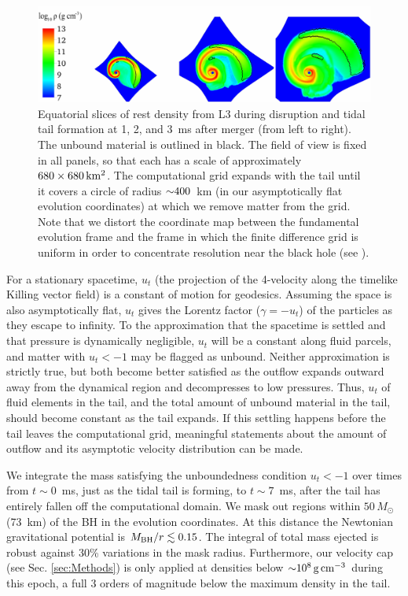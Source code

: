 \begin{figure}
\centering
\includegraphics[width=16cm]{Figures/rho_unbound_1ms_2ms_3ms}
\caption[Time sequence of dynamical ejecta]{
Equatorial slices of rest density from L3
during disruption and tidal tail formation at 1, 2, and 3~ms after merger
(from left to right).
The unbound material is outlined in black. The field of
view is fixed in all panels, so that each
has a scale of approximately $680\times680\rm\,km^2$.
The computational grid expands with the tail until it covers a circle of
radius $\mathord{\sim}400$~km (in our asymptotically flat evolution coordinates)
at which we remove matter from the grid. Note that we distort the
coordinate map between the fundamental evolution frame and the
frame in which the finite difference grid is uniform
in order to concentrate resolution near the black hole (see \citealt{duez2009-3d_eos_advection}).
}
\label{fig:disruptionsnapshots}
\end{figure}

For a stationary spacetime, $u_t$ (the projection of the 4-velocity along
the timelike Killing vector field) is a constant of motion for geodesics. 
Assuming the space is also asymptotically flat, $u_t$ gives the Lorentz
factor ($\gamma=-u_t$) of the particles as they escape to infinity.  To the
approximation that the spacetime is settled and that pressure is dynamically
negligible, $u_t$ will be a constant along fluid parcels, and matter with
$u_t<-1$ may be flagged as unbound. Neither approximation is strictly true,
but both become better satisfied as the outflow expands outward away from
the dynamical region and decompresses to low pressures.  Thus, $u_t$ of
fluid elements in the tail, and the total amount of unbound material in
the tail, should become constant as the tail expands.  If this settling
happens before the tail leaves the computational grid, meaningful statements
about the amount of outflow and its asymptotic velocity distribution can
be made.

We integrate the mass satisfying the unboundedness
condition $u_t<-1$ over times from $t \sim 0$~ms, just as
the tidal tail is forming, to $t \sim 7$~ms, after the tail has entirely fallen off
the computational domain. We mask out regions within
$50\,M_{\odot}$ (73~km) of the BH in the evolution coordinates.
At this distance the Newtonian gravitational
potential is $M_{\rm BH}/r \lesssim 0.15$.
The integral of total mass ejected is robust against
30\% variations in the mask radius.
Furthermore, our velocity cap (see Sec. \ref{sec:Methods}) is only applied
at densities below $\mathord{\sim} 10^{8}\rm\,g\,cm^{-3}$ during this epoch, a full 3
orders of magnitude below the maximum density in the tail.

